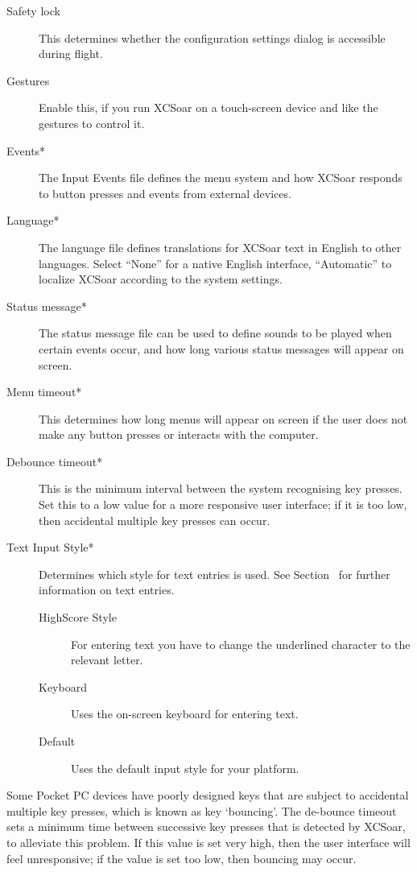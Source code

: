 \documentclass[a4paper,12pt]{refrep}
\begin{document}
\begin{description}
\item[Safety lock]  This determines whether the configuration settings dialog is
accessible during flight.
\item[Gestures]  Enable this, if you run XCSoar on a touch-screen device and
like the gestures to control it.
\item[Events*]  The Input Events file defines the menu system and how XCSoar
responds to button presses and events from external devices.
\item[Language*]  The language file defines translations for XCSoar text in English to
other languages.  Select ``None'' for a native English interface, ``Automatic''
to localize XCSoar according to the system settings.
\item[Status message*]  The status message file can be used to define sounds to be played when certain
events occur, and how long various status messages will appear on screen.
\item[Menu timeout*]  This determines how long menus will appear on screen if the user
does not make any button presses or interacts with the computer.
\item[Debounce timeout*]  This is the minimum interval between the system recognising key presses. 
Set this to a low value for a more responsive user interface; if
it is too low, then accidental multiple key presses can occur.

\item[Text Input Style*] Determines which style for text entries is used. See Section~ for further information on text entries.
\begin{description}
\item[HighScore Style] For entering text you have to change the underlined character to the relevant letter.
\item[Keyboard] Uses the on-screen keyboard for entering text.
\item[Default] Uses the default input style for your platform.
\end{description}
\end{description}

Some Pocket PC devices have poorly designed keys that are subject to
accidental multiple key presses, which is known as key `bouncing'.  The
de-bounce timeout sets a minimum time between successive key presses
that is detected by XCSoar, to alleviate this problem.  If this value
is set very high, then the user interface will feel unresponsive; if
the value is set too low, then bouncing may occur.
\end{document}
